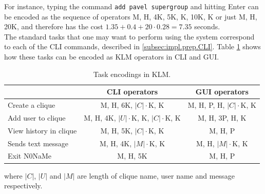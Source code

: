 \documentclass[a4paper, twoside, 12pt]{report}
\newcommand{\funkytt}{\fontfamily{AnonymousPro}\selectfont}
\begin{document}
For instance, typing the command \texttt{add pavel supergroup} and hitting Enter can be encoded as the sequence of operators M, H, 4K, 5K, K, 10K, K or just M, H, 20K, and therefore has the cost $1.35 + 0.4 + 20 \cdot 0.28 = 7.35$ seconds. \\


The standard tasks that one may want to perform using the system correspond to each of the CLI commands, described in \cref{subsec:impl.prep.CLI}. Table \ref{tab:KLM_encode} shows how these tasks can be encoded as KLM operators in CLI and GUI.

\begin{table}[H]
\centering
\begin{tabular*}{0.95\linewidth}{l | c | c}
        & CLI operators & GUI operators \\
\hline
Create a clique & M, H, 6K,  $|C|\cdot$K, K & M, H, P, H,  $|C|\cdot$K, K\\
Add user to clique & M, H, 4K, $|U|\cdot$K, K, $|C|\cdot$K, K & M, H, 3P, H, K \\
View history in clique & M, H, 5K, $|C|\cdot$K, K & M, H, P \\
Sends text message & M, H, 4K, $|M|\cdot$K, K & M, H, $|M|\cdot$K, K \\
Exit {\funkytt N0NaMe} & M, H, 5K & M, H, P \\
\end{tabular*}
\caption{\label{tab:KLM_encode} Task encodings in KLM.}
\end{table}

where $|C|$, $|U|$ and $|M|$ are length of clique name, user name and message respectively.
\end{document}

